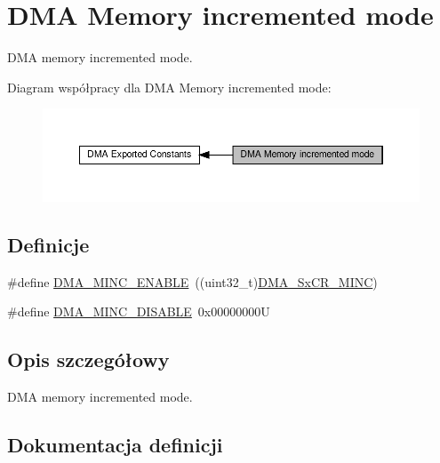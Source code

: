 \hypertarget{group___d_m_a___memory__incremented__mode}{}\section{D\+MA Memory incremented mode}
\label{group___d_m_a___memory__incremented__mode}


D\+MA memory incremented mode.  


Diagram współpracy dla D\+MA Memory incremented mode\+:\nopagebreak
\begin{figure}[H]
\begin{center}
\leavevmode
\includegraphics[width=350pt]{group___d_m_a___memory__incremented__mode}
\end{center}
\end{figure}
\subsection*{Definicje}
\begin{DoxyCompactItemize}
\item 
\#define \hyperlink{group___d_m_a___memory__incremented__mode_ga43d30885699cc8378562316ff4fed1cd}{D\+M\+A\+\_\+\+M\+I\+N\+C\+\_\+\+E\+N\+A\+B\+LE}~((uint32\+\_\+t)\hyperlink{group___peripheral___registers___bits___definition_ga771a295832a584a3777ede523a691719}{D\+M\+A\+\_\+\+Sx\+C\+R\+\_\+\+M\+I\+NC})
\item 
\#define \hyperlink{group___d_m_a___memory__incremented__mode_ga32625330516c188151743473fad97a33}{D\+M\+A\+\_\+\+M\+I\+N\+C\+\_\+\+D\+I\+S\+A\+B\+LE}~0x00000000U
\end{DoxyCompactItemize}


\subsection{Opis szczegółowy}
D\+MA memory incremented mode. 



\subsection{Dokumentacja definicji}
\mbox{\label{group___d_m_a___memory__incremented__mode_ga32625330516c188151743473fad97a33}} 

